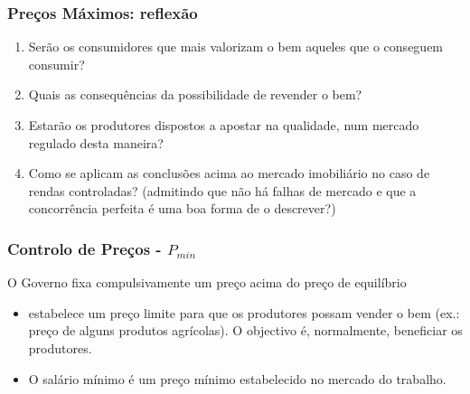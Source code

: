 \begin{frame}
	\frametitle{Pre\c cos M\'aximos: reflex\~ao}
	\begin{enumerate}
		\item Ser\~ao os consumidores que mais valorizam o bem aqueles que o conseguem consumir?
		\item Quais as consequ\^encias da possibilidade de revender o bem?
		\item Estar\~ao os produtores dispostos a apostar na qualidade, num mercado regulado desta maneira?
		\item Como se aplicam as conclus\~oes acima ao mercado imobili\'ario no caso de rendas controladas? (admitindo que n\~ao h\'a falhas de mercado e que a concorr\^encia perfeita \'e uma boa forma de o descrever?)
	\end{enumerate}
\end{frame}

\begin{frame}
	\frametitle{Controlo de Pre\c cos - $P_{min}$}
	O Governo fixa compulsivamente um pre\c co acima do pre\c co de equil\'ibrio
	\begin{itemize}
		\item estabelece um pre\c co limite para que os produtores possam vender o bem (ex.: pre\c co de alguns produtos agr\'icolas). O objectivo \'e, normalmente, beneficiar os produtores.
		\item O sal\'ario m\'inimo \'e um pre\c co m\'inimo estabelecido no mercado do trabalho.
	\end{itemize}
\end{frame}

